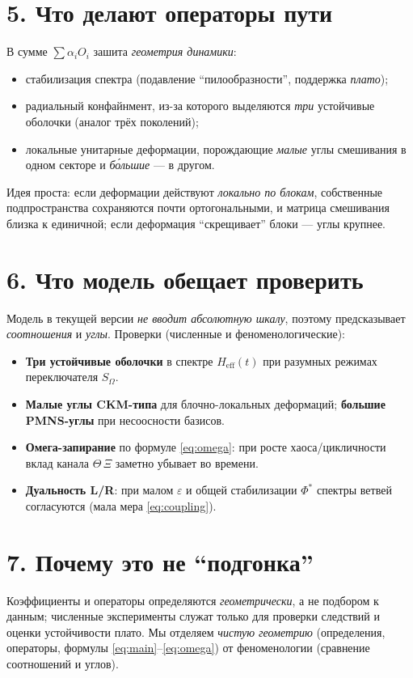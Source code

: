 \documentclass[a4paper,12pt]{article}
\begin{document}
\section*{5. Что делают операторы пути}
В сумме $\sum \alpha_i O_i$ зашита \emph{геометрия динамики}:
\begin{itemize}
  \item стабилизация спектра (подавление ``пилообразности'', поддержка \emph{плато});
  \item радиальный конфайнмент, из-за которого выделяются \emph{три} устойчивые оболочки (аналог трёх поколений);
  \item локальные унитарные деформации, порождающие \emph{малые} углы смешивания в одном секторе и \emph{б\'ольшие} --- в другом.
\end{itemize}
Идея проста: если деформации действуют \emph{локально по блокам}, собственные подпространства сохраняются почти ортогональными, и матрица смешивания близка к единичной; если деформация ``скрещивает'' блоки --- углы крупнее.

\section*{6. Что модель обещает проверить}
Модель в текущей версии \emph{не вводит абсолютную шкалу}, поэтому предсказывает \emph{соотношения} и \emph{углы}.
Проверки (численные и феноменологические):
\begin{itemize}
  \item \textbf{Три устойчивые оболочки} в спектре $H_{\mathrm{eff}}(t)$ при разумных режимах переключателя $S_\Omega$.
  \item \textbf{Малые углы CKM-типа} для блочно-локальных деформаций; \textbf{большие PMNS-углы} при несоосности базисов.
  \item \textbf{Омега-запирание} по формуле \eqref{eq:omega}: при росте хаоса/цикличности вклад канала $\Theta\,\Xi$ заметно убывает во времени.
  \item \textbf{Дуальность L/R}: при малом $\varepsilon$ и общей стабилизации $\Phi^\ast$ спектры ветвей согласуются (мала мера \eqref{eq:coupling}).
\end{itemize}

\section*{7. Почему это не ``подгонка''}
Коэффициенты и операторы определяются \emph{геометрически}, а не подбором к данным; численные эксперименты служат только для проверки следствий и оценки устойчивости плато.
Мы отделяем \emph{чистую геометрию} (определения, операторы, формулы \eqref{eq:main}--\eqref{eq:omega}) от феноменологии (сравнение соотношений и углов).
\end{document}
